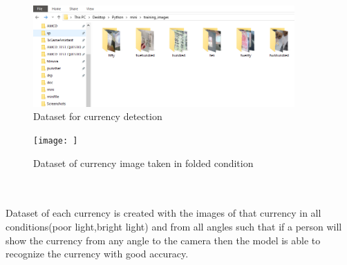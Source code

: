 \begin{figure}[h!]
	\centering
	\includegraphics[width=100mm]{CHAPTERS/data2.PNG}
	\caption{Dataset for currency detection}
\end{figure}
\begin{figure}[h!]
	\centering
	\texttt{[image: ]}
	\caption{Dataset of currency image  taken in folded condition}
\end{figure}
\\\\
Dataset of each currency is created with the images of that currency in all conditions(poor light,bright light) and from all angles such that if a person will show the currency from any angle to the camera then the model is able to recognize the currency with good accuracy.\\\\
